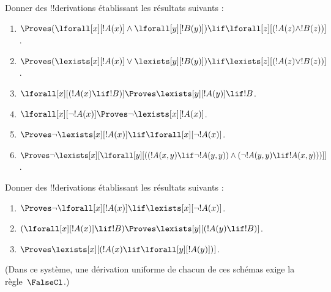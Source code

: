 \documentclass[../../../include/open-logic-section]{subfiles}
\begin{document}
\begin{prob}
Donner des !!{derivation}s établissant les résultats suivants :
\begin{enumerate}
\item $\Proves (\lforall[x][!A(x)] \land \lforall[y][!B(y)]) \lif
\lforall[z][(!A(z) \land !B(z))]$.
\item $\Proves (\lexists[x][!A(x)] \lor \lexists[y][!B(y)]) \lif
\lexists[z][(!A(z) \lor !B(z))]$.
\item $\lforall[x][(!A(x) \lif !B)] \Proves \lexists[y][!A(y)] \lif !B$.
\item $\lforall[x][\lnot !A(x)] \Proves \lnot\lexists[x][!A(x)]$.
\item $\Proves \lnot\lexists[x][!A(x)] \lif \lforall[x][\lnot !A(x)]$.
\item $\Proves \lnot\lexists[x][\lforall[y][((!A(x,y) \lif \lnot
!A(y,y)) \land (\lnot !A(y,y) \lif !A(x,y)))]]$.
\end{enumerate}
\end{prob}

\begin{prob}
Donner des !!{derivation}s établissant les résultats suivants :
\begin{enumerate}
\item $\Proves \lnot\lforall[x][!A(x)] \lif \lexists[x][\lnot!A(x)]$.
\item $(\lforall[x][!A(x)] \lif !B) \Proves \lexists[y][(!A(y) \lif !B)]$.
\item $\Proves \lexists[x][(!A(x) \lif \lforall[y][!A(y)])]$.
\end{enumerate}
(Dans ce système, une dérivation uniforme de chacun de ces
schémas exige la règle~$\FalseCl$.)
\end{prob}
%
%
%
%
%
%
%
%
%
%
%
%
%
\end{document}
